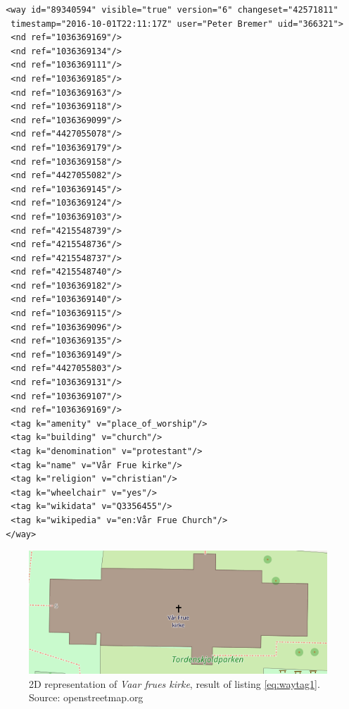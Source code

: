 \begin{lstlisting}
 <way id="89340594" visible="true" version="6" changeset="42571811" 
  timestamp="2016-10-01T22:11:17Z" user="Peter Bremer" uid="366321">
  <nd ref="1036369169"/>
  <nd ref="1036369134"/>
  <nd ref="1036369111"/>
  <nd ref="1036369185"/>
  <nd ref="1036369163"/>
  <nd ref="1036369118"/>
  <nd ref="1036369099"/>
  <nd ref="4427055078"/>
  <nd ref="1036369179"/>
  <nd ref="1036369158"/>
  <nd ref="4427055082"/>
  <nd ref="1036369145"/>
  <nd ref="1036369124"/>
  <nd ref="1036369103"/>
  <nd ref="4215548739"/>
  <nd ref="4215548736"/>
  <nd ref="4215548737"/>
  <nd ref="4215548740"/>
  <nd ref="1036369182"/>
  <nd ref="1036369140"/>
  <nd ref="1036369115"/>
  <nd ref="1036369096"/>
  <nd ref="1036369135"/>
  <nd ref="1036369149"/>
  <nd ref="4427055803"/>
  <nd ref="1036369131"/>
  <nd ref="1036369107"/>
  <nd ref="1036369169"/>
  <tag k="amenity" v="place_of_worship"/>
  <tag k="building" v="church"/>
  <tag k="denomination" v="protestant"/>
  <tag k="name" v="Vår Frue kirke"/>
  <tag k="religion" v="christian"/>
  <tag k="wheelchair" v="yes"/>
  <tag k="wikidata" v="Q3356455"/>
  <tag k="wikipedia" v="en:Vår Frue Church"/>
 </way>
\end{lstlisting}

\begin{figure}[H]
    \centering
    \includegraphics[scale=0.5]{figures/FixedByMe/fruekirke2D.png}
    \caption{2D representation of \textit{Vaar frues kirke}, result of listing \ref{eq:waytag1}. Source: openstreetmap.org}
    \label{fig:fruekirke2D}
\end{figure}

